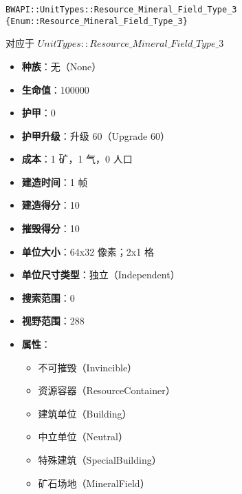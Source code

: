 \begin{tcolorbox}[colback=white, colframe=black!60!white, title=Resource\_Mineral\_Field\_Type\_3(), arc=0mm]
    \begin{verbatim}
BWAPI::UnitTypes::Resource_Mineral_Field_Type_3 {Enum::Resource_Mineral_Field_Type_3}
    \end{verbatim}
    对应于  $UnitTypes::Resource\_Mineral\_Field\_Type\_3$ 
    \begin{itemize}
        \item \textbf{种族}：无（None）
        \item \textbf{生命值}：100000
        \item \textbf{护甲}：0
        \item \textbf{护甲升级}：升级 60（Upgrade 60）
        \item \textbf{成本}：1 矿，1 气，0 人口
        \item \textbf{建造时间}：1 帧
        \item \textbf{建造得分}：10
        \item \textbf{摧毁得分}：10
        \item \textbf{单位大小}：64x32 像素；2x1 格
        \item \textbf{单位尺寸类型}：独立（Independent）
        \item \textbf{搜索范围}：0
        \item \textbf{视野范围}：288
        \item \textbf{属性}：
            \begin{itemize}
                \item 不可摧毁（Invincible）
                \item 资源容器（ResourceContainer）
                \item 建筑单位（Building）
                \item 中立单位（Neutral）
                \item 特殊建筑（SpecialBuilding）
                \item 矿石场地（MineralField）
            \end{itemize}
    \end{itemize}
\end{tcolorbox}

